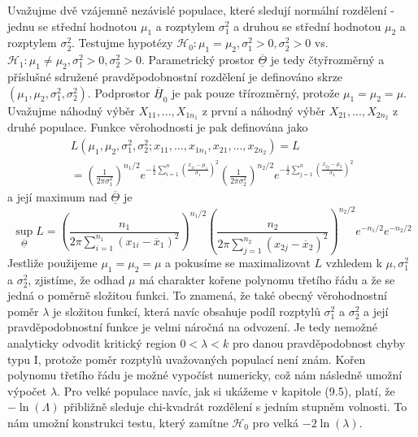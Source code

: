 Uvažujme dvě vzájemně nezávislé populace, které sledují normální rozdělení - jednu se střední hodnotou $\mu_1$ a rozptylem $\sigma_1^2$ a druhou se střední hodnotou $\mu_2$ a rozptylem $\sigma_2^2$. Testujme hypotézy $\mathscr{H}_0: \mu_1 = \mu_2, \sigma_1^2 > 0, \sigma_2^2 > 0$ vs. $\mathscr{H}_1: \mu_1 \neq \mu_2, \sigma_1^2 > 0, \sigma_2^2 > 0$. Parametrický prostor $\overline{\underline{\Theta}}$ je tedy čtyřrozměrný a příslušné sdružené pravděpodobnostní rozdělení je definováno skrze $(\mu_1, \mu_2, \sigma_1^2, \sigma_2^2)$. Podprostor $\overline{\underline{H}}_0$ je pak pouze třírozměrný, protože $\mu_1 = \mu_2 = \mu$. Uvažujme náhodný výběr $X_{11}, ..., X_{1n_1}$ z první a náhodný výběr  $X_{21}, ..., X_{2n_2}$ z druhé populace. Funkce věrohodnosti je pak definována jako
\begin{multline*}
L(\mu_1, \mu_2, \sigma_1^2, \sigma_2^2; x_{11}, ..., x_{1n_1}, x_{21}, ..., x_{2n_2}) = L\\
= \left(\frac{1}{2\pi \sigma_1^2}\right)^{n_1/2}e^{-\frac{1}{2}\sum_{i = 1}^n \left(\frac{x_{1i} - \mu_1}{\sigma_1}\right)^2} \left(\frac{1}{2\pi \sigma_2^2}\right)^{n_2/2}e^{-\frac{1}{2}\sum_{j = 1}^n \left(\frac{x_{2j} - \mu_2}{\sigma_2}\right)^2}
\end{multline*}
a její maximum nad $\overline{\underline{\Theta}}$ je
\begin{equation*}
\sup_{\overline{\underline{\Theta}}}L = \left(\frac{n_1}{2 \pi \sum_{i = 1}^{n_1}(x_{1i} - \overline{x}_1)^2}\right)^{n_1/2} \left(\frac{n_2}{2 \pi \sum_{j = 1}^{n_2}(x_{2j} - \overline{x}_2)^2}\right)^{n_2/2}e^{-n_1/2}e^{-n_2/2}
\end{equation*}
Jestliže použijeme $\mu_1 = \mu_2 = \mu$ a pokusíme se maximalizovat $L$ vzhledem k $\mu, \sigma_1^2$ a $\sigma_2^2$, zjistíme, že odhad $\mu$ má charakter kořene polynomu třetího řádu a že se jedná o poměrně složitou funkci. To znamená, že také obecný věrohodnostní poměr $\lambda$ je složitou funkcí, která navíc obsahuje podíl rozptylů $\sigma_1^2$ a $\sigma_2^2$ a její pravděpodobnostní funkce je velmi náročná na odvození. Je tedy nemožné analyticky odvodit kritický region $0 < \lambda < k$ pro danou pravděpodobnost chyby typu I, protože poměr rozptylů uvažovaných populací není znám. Kořen polynomu třetího řádu je možné vypočíst numericky, což nám následně umožní výpočet $\lambda$. Pro velké populace navíc, jak si ukážeme v kapitole (9.5), platí, že $- \ln(\Lambda)$ přibližně sleduje chi-kvadrát rozdělení s jedním stupněm volnosti. To nám umožní konstrukci testu, který zamítne $\mathscr{H}_0$ pro velká $-2 \ln(\lambda)$.

